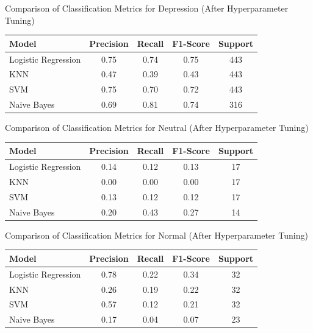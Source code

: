 \begin{center}
\vspace{0.25in}

\caption{Comparison of Classification Metrics for Depression (After Hyperparameter Tuning)}
\begin{tabular}{|l|c|c|c|c|}
\hline
\textbf{Model} & \textbf{Precision} & \textbf{Recall} & \textbf{F1-Score} & \textbf{Support} \\ \hline
Logistic Regression & 0.75 & 0.74 & 0.75 & 443 \\ \hline
KNN                & 0.47 & 0.39 & 0.43 & 443 \\ \hline
SVM                & 0.75 & 0.70 & 0.72 & 443 \\ \hline
Naive Bayes        & 0.69 & 0.81 & 0.74 & 316 \\ \hline
\end{tabular}

\vspace{0.25in}

\caption{Comparison of Classification Metrics for Neutral (After Hyperparameter Tuning)}
\begin{tabular}{|l|c|c|c|c|}
\hline
\textbf{Model} & \textbf{Precision} & \textbf{Recall} & \textbf{F1-Score} & \textbf{Support} \\ \hline
Logistic Regression & 0.14 & 0.12 & 0.13 & 17 \\ \hline
KNN                & 0.00 & 0.00 & 0.00 & 17 \\ \hline
SVM                & 0.13 & 0.12 & 0.12 & 17 \\ \hline
Naive Bayes        & 0.20 & 0.43 & 0.27 & 14 \\ \hline
\end{tabular}

\vspace{0.25in}

\caption{Comparison of Classification Metrics for Normal (After Hyperparameter Tuning)}
\begin{tabular}{|l|c|c|c|c|}
\hline
\textbf{Model} & \textbf{Precision} & \textbf{Recall} & \textbf{F1-Score} & \textbf{Support} \\ \hline
Logistic Regression & 0.78 & 0.22 & 0.34 & 32 \\ \hline
KNN                & 0.26 & 0.19 & 0.22 & 32 \\ \hline
SVM                & 0.57 & 0.12 & 0.21 & 32 \\ \hline
Naive Bayes        & 0.17 & 0.04 & 0.07 & 23 \\ \hline
\end{tabular}


\end{center}
